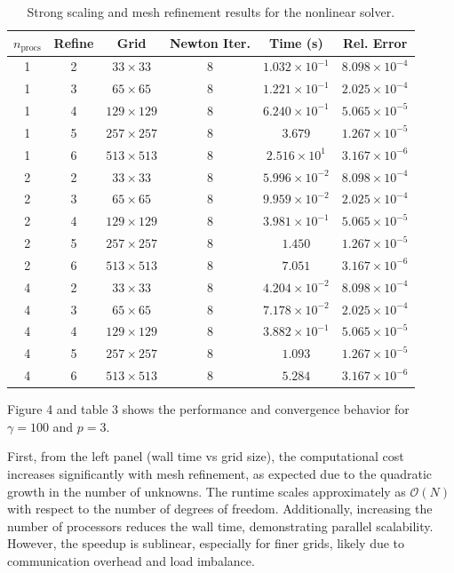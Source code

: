 \documentclass[12pt]{article}
\begin{document}
\begin{table}[h!]
	\centering
	\begin{tabular}{cccccc}
		\toprule
		$n_{\text{procs}}$ & Refine & Grid & Newton Iter. & Time (s) & Rel. Error \\
		\midrule
		1 & 2 & $33\times33$   & 8 & $1.032\times10^{-1}$ & $8.098\times10^{-4}$ \\
		1 & 3 & $65\times65$   & 8 & $1.221\times10^{-1}$ & $2.025\times10^{-4}$ \\
		1 & 4 & $129\times129$ & 8 & $6.240\times10^{-1}$ & $5.065\times10^{-5}$ \\
		1 & 5 & $257\times257$ & 8 & $3.679$  & $1.267\times10^{-5}$ \\
		1 & 6 & $513\times513$ & 8 & $2.516\times10^{1}$  & $3.167\times10^{-6}$ \\
		\midrule
		2 & 2 & $33\times33$   & 8 & $5.996\times10^{-2}$ & $8.098\times10^{-4}$ \\
		2 & 3 & $65\times65$   & 8 & $9.959\times10^{-2}$ & $2.025\times10^{-4}$ \\
		2 & 4 & $129\times129$ & 8 & $3.981\times10^{-1}$ & $5.065\times10^{-5}$ \\
		2 & 5 & $257\times257$ & 8 & $1.450$  & $1.267\times10^{-5}$ \\
		2 & 6 & $513\times513$ & 8 & $7.051$  & $3.167\times10^{-6}$ \\
		\midrule
		4 & 2 & $33\times33$   & 8 & $4.204\times10^{-2}$ & $8.098\times10^{-4}$ \\
		4 & 3 & $65\times65$   & 8 & $7.178\times10^{-2}$ & $2.025\times10^{-4}$ \\
		4 & 4 & $129\times129$ & 8 & $3.882\times10^{-1}$ & $5.065\times10^{-5}$ \\
		4 & 5 & $257\times257$ & 8 & $1.093$  & $1.267\times10^{-5}$ \\
		4 & 6 & $513\times513$ & 8 & $5.284$  & $3.167\times10^{-6}$ \\
		\bottomrule
	\end{tabular}
	\caption{Strong scaling and mesh refinement results for the nonlinear solver.}
	\label{tab:scaling_results}
\end{table}


Figure 4 and table 3 shows the performance and convergence behavior for $\gamma=100$ and $p=3$.

First, from the left panel (wall time vs grid size), the computational cost increases significantly with mesh refinement, as expected due to the quadratic growth in the number of unknowns. The runtime scales approximately as $\mathcal{O}(N)$ with respect to the number of degrees of freedom. Additionally, increasing the number of processors reduces the wall time, demonstrating parallel scalability. However, the speedup is sublinear, especially for finer grids, likely due to communication overhead and load imbalance.
\end{document}
